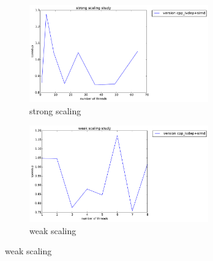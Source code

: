 \documentclass[12pt]{article}
\numberwithin{equation}{section}
\begin{document}
\begin{figure}[!ht]
   \begin{subfigure}
      \centering
        \begin{center}
      \includegraphics[width=0.85\textwidth] {plots/cpp_strong_ivdep+simd}
        \end{center}
      \label{aload0}
      \caption{strong scaling}
  \end{subfigure}
  \begin{subfigure}
      \centering
        \begin{center}
      \includegraphics[width=0.85\textwidth] {plots/cpp_weak_ivdep+simd}
        \end{center}
      \label{aload1}
      \caption{weak scaling}
  \end{subfigure}
\end{figure}
\end{document}
